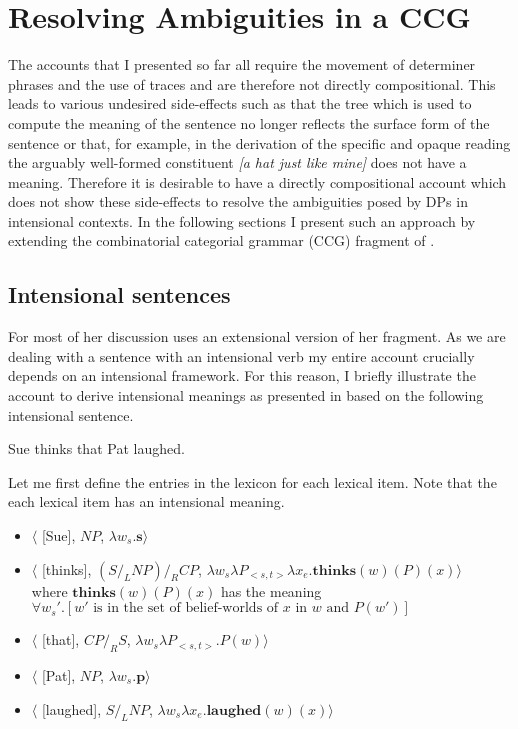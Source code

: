\documentclass[parskip=half]{scrartcl}
\begin{document}
\normalsize

\section{Resolving Ambiguities in a CCG}

The accounts that I presented so far all require the movement of determiner phrases and the use of traces and are therefore not directly compositional. This leads to various undesired side-effects such as that the tree which is used to compute the meaning of the sentence no longer reflects the surface form of the sentence or that, for example, in the derivation of the specific and opaque reading the arguably well-formed constituent \textit{[a hat just like mine]} does not have a meaning. Therefore it is desirable to have a directly compositional account which does not show these side-effects to resolve the ambiguities posed by DPs in intensional contexts.  In the following sections I present such an approach by extending the combinatorial categorial grammar (CCG) fragment of \cite{jacobson2014}.

\subsection{Intensional sentences}

For most of her discussion \cite{jacobson2014} uses an extensional version of her fragment. As we are dealing with a sentence with an intensional verb 
my entire account crucially depends on an intensional framework. For this reason, I briefly illustrate the account to derive intensional
meanings as presented in  \citet[Ch.\ 20]{jacobson2014} based on the following intensional sentence.

\begin{exe}
\ex \label{ex:h-thinks-b-laughed} Sue thinks that Pat laughed.
\end{exe}

Let me first define the entries in the lexicon for each lexical item. Note that the
each lexical item has an intensional meaning.
\begin{itemize}
\item $\langle$ [Sue], $NP$, $\lambda w_s. \mathbf{s} \rangle$
\item $\langle$ [thinks], $(S/_LNP)/_R CP$, $\lambda w_s \lambda P_{<s,t>} \lambda x_e. \mathbf{thinks}(w)(P)(x)  \rangle$ \\
where  $\mathbf{thinks}(w)(P)(x)$ has the meaning \\ $\forall w_s'. [w' \mbox{ is in the set of belief-worlds of $x$ in $w$ and $P(w')$}]$
\item $\langle$ [that], $CP/_R S$, $\lambda w_s \lambda P_{<s,t>}. P(w) \rangle$
\item $\langle$ [Pat], $NP$, $\lambda w_s. \mathbf{p} \rangle$
\item $\langle$ [laughed], $S/_L NP$, $\lambda w_s \lambda x_e. \mathbf{laughed}(w)(x) \rangle$
\end{itemize}
\end{document}
